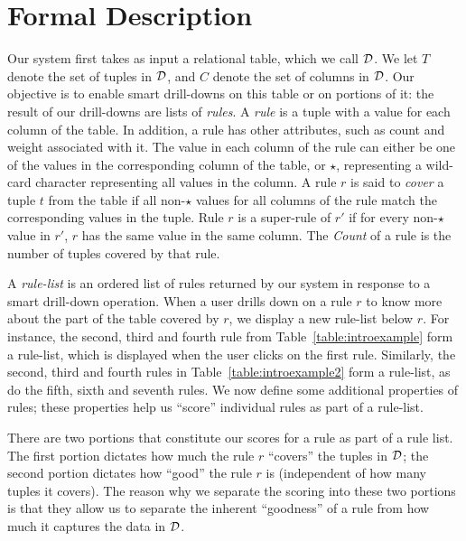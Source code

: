 
\section{Formal Description} \label{sec:formal} 

 Our system first takes as input a relational table, which we call $\mathcal{D}$. 
We let $T$ denote the set of tuples in $\mathcal{D}$, and $C$ denote 
the set of columns in $\mathcal{D}$.
Our objective is to 
enable smart drill-downs on this table or on portions of it:
the result of our drill-downs are lists of {\em rules}. 
A {\em rule} is a tuple with a value for each column of the table. 
In addition, a rule has other attributes, such as count and weight associated with it. 
The value in each column of the rule can either be one of the values in the corresponding column of the table, or $\star$, representing a wild-card character representing all values in the column. A rule $r$ is said to {\em cover} a tuple $t$ from the table if all non-$\star$ values for all columns of the rule match the corresponding values in the tuple. Rule $r$ is a super-rule of $r'$ if for every non-$\star$ value in $r'$, $r$ has the same value in the same column. The {\em Count} of a rule is the number of tuples covered by that rule. 

 A {\em rule-list} is an ordered list of rules returned by our system in response to a smart drill-down operation. 
When a user drills down on a rule $r$ to know more about the part of the table covered by $r$, we display a new rule-list below $r$.
For instance, the second, third and fourth rule from Table~\ref{table:introexample} form a rule-list, which is displayed when the user clicks on the first rule. Similarly, the second, third and fourth rules in Table~\ref{table:introexample2} form a rule-list, as do the fifth, sixth and seventh rules. We now define some additional properties of rules; these properties
help us ``score'' individual rules as part of a rule-list. 

 There are two portions that constitute our scores for a rule as part of a rule list. 
The first portion dictates how much the rule $r$ ``covers'' the tuples in $\mathcal{D}$;
the second portion dictates how ``good'' the rule $r$ is (independent of how many
tuples it covers). 
The reason why we separate the scoring into these two portions is
that they allow us to separate the inherent ``goodness'' of a rule from
how much it captures the data in $\mathcal{D}$.

